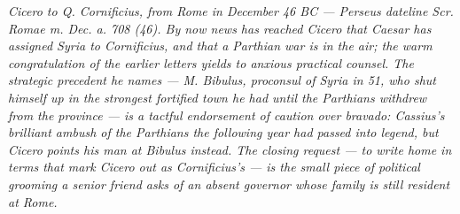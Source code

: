 
\textit{Cicero to Q. Cornificius, from Rome in December 46 BC ---
Perseus dateline \textit{Scr. Romae m. Dec. a. 708 (46)}.
By now news has reached Cicero that Caesar has assigned Syria to
Cornificius, and that a Parthian war is in the air; the warm
congratulation of the earlier letters yields to anxious practical
counsel. The strategic precedent he names --- M. Bibulus, proconsul
of Syria in 51, who shut himself up in the strongest fortified town
he had until the Parthians withdrew from the province --- is a tactful
endorsement of caution over bravado: Cassius's brilliant ambush of
the Parthians the following year had passed into legend, but Cicero
points his man at Bibulus instead. The closing request --- to write
home in terms that mark Cicero out as Cornificius's --- is the small
piece of political grooming a senior friend asks of an absent
governor whose family is still resident at Rome.}
